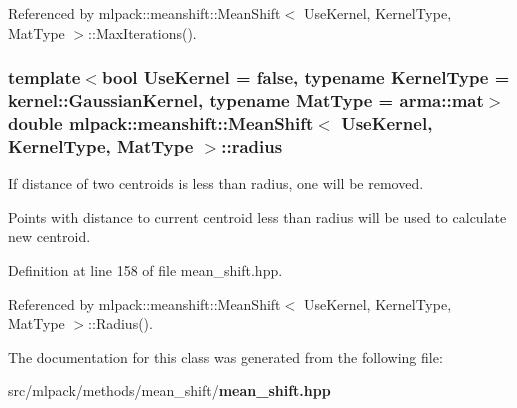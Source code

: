 Referenced by mlpack\+::meanshift\+::\+Mean\+Shift$<$ Use\+Kernel, Kernel\+Type, Mat\+Type $>$\+::\+Max\+Iterations().

\subsubsection[{radius}]{\setlength{\rightskip}{0pt plus 5cm}template$<$bool Use\+Kernel = false, typename Kernel\+Type  = kernel\+::\+Gaussian\+Kernel, typename Mat\+Type  = arma\+::mat$>$ double {\bf mlpack\+::meanshift\+::\+Mean\+Shift}$<$ Use\+Kernel, Kernel\+Type, Mat\+Type $>$\+::radius\hspace{0.3cm}{\ttfamily [private]}}\label{classmlpack_1_1meanshift_1_1MeanShift_ac58cdbc587030f79cb05658d0221a88a}


If distance of two centroids is less than radius, one will be removed. 

Points with distance to current centroid less than radius will be used to calculate new centroid. 

Definition at line 158 of file mean\+\_\+shift.\+hpp.



Referenced by mlpack\+::meanshift\+::\+Mean\+Shift$<$ Use\+Kernel, Kernel\+Type, Mat\+Type $>$\+::\+Radius().



The documentation for this class was generated from the following file\+:\begin{DoxyCompactItemize}
\item 
src/mlpack/methods/mean\+\_\+shift/{\bf mean\+\_\+shift.\+hpp}\end{DoxyCompactItemize}
